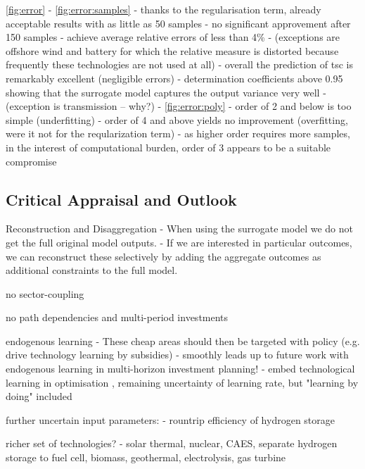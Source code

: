 \cref{fig:error}
- \cref{fig:error:samples}
  - thanks to the regularisation term, already acceptable results with as little as 50 samples
  - no significant approvement after 150 samples
  - achieve average relative errors of less than 4\%
  - (exceptions are offshore wind and battery for which the relative measure is distorted because frequently these technologies are not used at all)
  - overall the prediction of tsc is remarkably excellent (negligible errors)
  - determination coefficients above 0.95 showing that the surrogate model captures the output variance very well
  - (exception is transmission -- why?)
- \cref{fig:error:poly}
  - order of 2 and below is too simple (underfitting)
  - order of 4 and above yields no improvement (overfitting, were it not for the reqularization term)
  - as higher order requires more samples, in the interest of computational burden, order of 3 appears to be a suitable compromise




\subsection{Critical Appraisal and Outlook}

Reconstruction and Disaggregation
- When using the surrogate model we do not get the full original model outputs.
- If we are interested in particular outcomes, we can reconstruct these selectively
by adding the aggregate outcomes as additional constraints to the full model.

no sector-coupling

no path dependencies and multi-period investments

endogenous learning
- These cheap areas should then be targeted with policy (e.g. drive technology learning by subsidies)
- smoothly leads up to future work with endogenous learning in multi-horizon investment planning!
- embed technological learning in optimisation \cite{heuberger_power_2017} \cite{lopion_cost_2019}, remaining uncertainty of learning rate, but "learning by doing" included

further uncertain input parameters:
- rountrip efficiency of hydrogen storage

richer set of technologies?
- solar thermal, nuclear, CAES, separate hydrogen storage to fuel cell, biomass, geothermal, electrolysis, gas turbine
